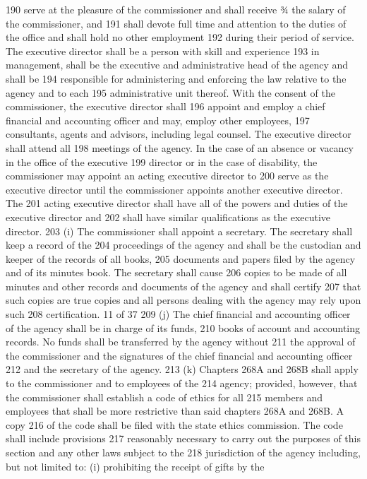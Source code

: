 190 serve at the pleasure of the commissioner and shall receive ¾ the salary of the commissioner, and
191 shall devote full time and attention to the duties of the office and shall hold no other employment
192 during their period of service. The executive director shall be a person with skill and experience
193 in management, shall be the executive and administrative head of the agency and shall be
194 responsible for administering and enforcing the law relative to the agency and to each
195 administrative unit thereof. With the consent of the commissioner, the executive director shall
196 appoint and employ a chief financial and accounting officer and may, employ other employees,
197 consultants, agents and advisors, including legal counsel. The executive director shall attend all
198 meetings of the agency. In the case of an absence or vacancy in the office of the executive
199 director or in the case of disability, the commissioner may appoint an acting executive director to
200 serve as the executive director until the commissioner appoints another executive director. The
201 acting executive director shall have all of the powers and duties of the executive director and
202 shall have similar qualifications as the executive director.
203 (i) The commissioner shall appoint a secretary. The secretary shall keep a record of the
204 proceedings of the agency and shall be the custodian and keeper of the records of all books,
205 documents and papers filed by the agency and of its minutes book. The secretary shall cause
206 copies to be made of all minutes and other records and documents of the agency and shall certify
207 that such copies are true copies and all persons dealing with the agency may rely upon such
208 certification.
11 of 37
209 (j) The chief financial and accounting officer of the agency shall be in charge of its funds,
210 books of account and accounting records. No funds shall be transferred by the agency without
211 the approval of the commissioner and the signatures of the chief financial and accounting officer
212 and the secretary of the agency.
213 (k) Chapters 268A and 268B shall apply to the commissioner and to employees of the
214 agency; provided, however, that the commissioner shall establish a code of ethics for all
215 members and employees that shall be more restrictive than said chapters 268A and 268B. A copy
216 of the code shall be filed with the state ethics commission. The code shall include provisions
217 reasonably necessary to carry out the purposes of this section and any other laws subject to the
218 jurisdiction of the agency including, but not limited to: (i) prohibiting the receipt of gifts by the
